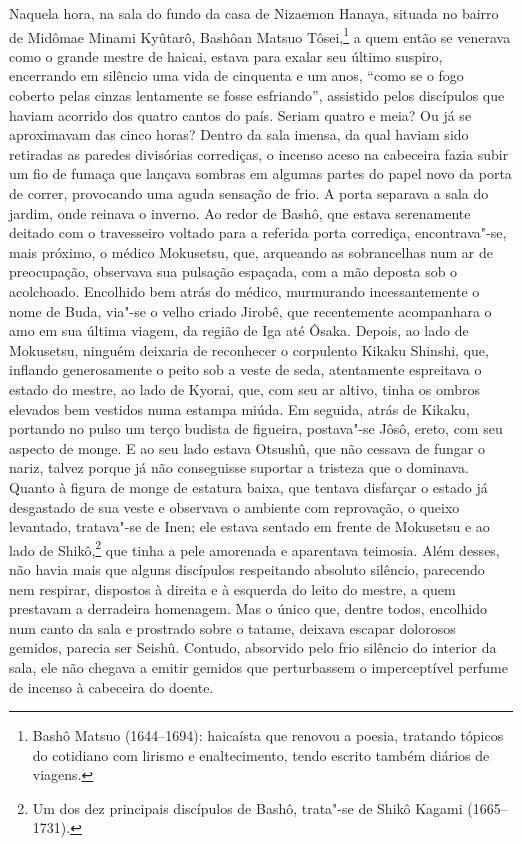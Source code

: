 Naquela hora, na sala do fundo da casa de Nizaemon Hanaya, situada no
bairro de Midômae Minami Kyûtarô, Bashôan Matsuo Tôsei,\footnote{ Bashô Matsuo 
(1644--1694): haicaísta que renovou a poesia, tratando tópicos do
cotidiano com lirismo e enaltecimento, tendo escrito também diários de
viagens.} a quem então se venerava como o grande mestre de haicai,
estava para exalar seu último suspiro, encerrando em silêncio uma vida
de cinquenta e um anos, ``como se o fogo coberto pelas
cinzas lentamente se fosse esfriando'', assistido pelos
discípulos que haviam acorrido dos quatro cantos do país. Seriam quatro
e meia? Ou já se aproximavam das cinco horas? Dentro da sala imensa, da
qual haviam sido retiradas as paredes divisórias corrediças, o incenso
aceso na cabeceira fazia subir um fio de fumaça que lançava sombras em
algumas partes do papel novo da porta de correr, provocando uma aguda
sensação de frio. A porta separava a sala do jardim, onde reinava o
inverno. Ao redor de Bashô, que estava serenamente deitado com o
travesseiro voltado para a referida porta corrediça, encontrava"-se,
mais próximo, o médico Mokusetsu, que, arqueando as sobrancelhas num ar
de preocupação, observava sua pulsação espaçada, com a mão deposta sob
o acolchoado. Encolhido bem atrás do médico, murmurando incessantemente
o nome de Buda, via"-se o velho criado Jirobê, que recentemente
acompanhara o amo em sua última viagem, da região de Iga até Ôsaka.
Depois, ao lado de Mokusetsu, ninguém deixaria de reconhecer o
corpulento Kikaku Shinshi, que, inflando generosamente o peito sob a
veste de seda, atentamente espreitava o estado do mestre, ao lado de
Kyorai, que, com seu ar altivo, tinha os ombros elevados bem vestidos
numa estampa miúda. Em seguida, atrás de Kikaku, portando no pulso um
terço budista de figueira, postava"-se Jôsô, ereto, com seu aspecto de
monge. E ao seu lado estava Otsushû, que não cessava de fungar o nariz,
talvez porque já não conseguisse suportar a tristeza que o dominava.
Quanto à figura de monge de estatura baixa, que tentava disfarçar o
estado já desgastado de sua veste e observava o ambiente com
reprovação, o queixo levantado, tratava"-se de Inen; ele estava sentado
em frente de Mokusetsu e ao lado de Shikô,\footnote{ Um dos dez
principais discípulos de Bashô, trata"-se de Shikô Kagami (1665--1731).}
que tinha a pele amorenada e aparentava teimosia. Além desses, não
havia mais que alguns discípulos respeitando absoluto silêncio,
parecendo nem respirar, dispostos à direita e à esquerda do leito do
mestre, a quem prestavam a derradeira homenagem. Mas o único que,
dentre todos, encolhido num canto da sala e prostrado sobre o tatame,
deixava escapar dolorosos gemidos, parecia ser Seishû. Contudo,
absorvido pelo frio silêncio do interior da sala, ele não chegava a
emitir gemidos que perturbassem o imperceptível perfume de incenso à
cabeceira do doente.

